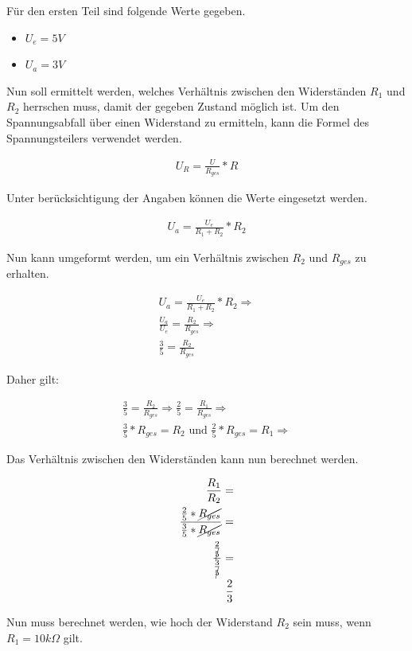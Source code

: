 Für den ersten Teil sind folgende Werte gegeben.
\begin{itemize}
    \item $U_e = 5V$
    \item $U_a = 3V$
\end{itemize}

Nun soll ermittelt werden, welches Verhältnis zwischen den Widerständen $R_1$ und $R_2$ herrschen muss, damit der gegeben Zustand möglich ist.
Um den Spannungsabfall über einen Widerstand zu ermitteln, kann die Formel des Spannungsteilers verwendet werden.

\begin{align}
    U_R = \frac{U}{R_{ges}} * R
\end{align}

Unter berücksichtigung der Angaben können die Werte eingesetzt werden.

\begin{align}
    U_a = \frac{U_e}{R_1 + R_2} * R_2
\end{align}

Nun kann umgeformt werden, um ein Verhältnis zwischen $R_2$ und $R_{ges}$ zu erhalten.

\begin{align}
    U_a = \frac{U_e}{R_1 + R_2} * R_2 \Rightarrow\\
    \frac{U_a}{U_e} = \frac{R_2}{R_{ges}} \Rightarrow\\
    \frac{3}{5} = \frac{R_2}{R_{ges}}
\end{align}

Daher gilt:

\begin{align}
    \frac{3}{5} = \frac{R_2}{R_{ges}} \Rightarrow \frac{2}{5} = \frac{R_1}{R_{ges}} \Rightarrow \\
    \frac{3}{5} * R_{ges} = R_2 \text{ und } \frac{2}{5} * R_{ges} = R_1 \Rightarrow
\end{align}

Das Verhältnis zwischen den Widerständen kann nun berechnet werden.

\begin{align}
    \frac{R_1}{R_2} = \\
    \frac{\frac{2}{5} * \cancel{R_{ges}}}{\frac{3}{5} * \cancel{R_{ges}}} = \\
    \frac{\frac{2}{\cancel{5}}}{\frac{3}{\cancel{5}}} = \\
    \frac{2}{3}
\end{align}

Nun muss berechnet werden, wie hoch der Widerstand $R_2$ sein muss, wenn $R_1 = 10k\Omega$ gilt.

